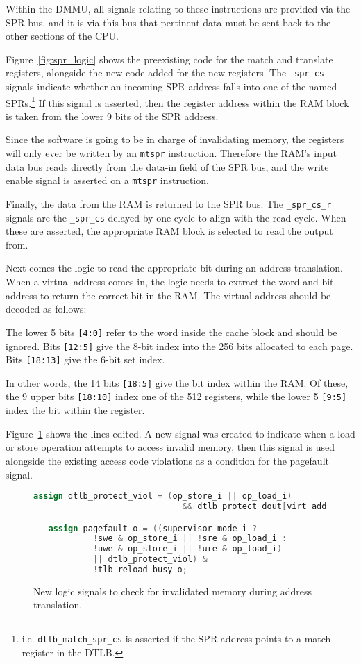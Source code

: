 Within the DMMU, all signals relating to these instructions are provided via the SPR bus, and it is via this bus that pertinent data must be sent back to the other sections of the CPU.

Figure~\ref{fig:spr_logic} shows the preexisting code for the match and translate registers, alongside the new code added for the new registers. The \verb|_spr_cs| signals indicate whether an incoming SPR address falls into one of the named SPRs.\footnote{i.e. \texttt{dtlb\_match\_spr\_cs} is asserted if the SPR address points to a match register in the DTLB.} If this signal is asserted, then the register address within the RAM block is taken from the lower 9 bits of the SPR address.

Since the software is going to be in charge of invalidating memory, the registers will only ever be written by an \texttt{mtspr} instruction. Therefore the RAM's input data bus reads directly from the data-in field of the SPR bus, and the write enable signal is asserted on a \texttt{mtspr} instruction.

Finally, the data from the RAM is returned to the SPR bus. The \verb|_spr_cs_r| signals are the \verb|_spr_cs| delayed by one cycle to align with the read cycle. When these are asserted, the appropriate RAM block is selected to read the output from.

Next comes the logic to read the appropriate bit during an address translation. When a virtual address comes in, the logic needs to extract the word and bit address to return the correct bit in the RAM. The virtual address should be decoded as follows:

The lower 5 bits \texttt{[4:0]} refer to the word inside the cache block and should be ignored. Bits \texttt{[12:5]} give the 8-bit index into the 256 bits allocated to each page. Bits \texttt{[18:13]} give the 6-bit set index.

In other words, the 14 bits \texttt{[18:5]} give the bit index within the RAM. Of these, the 9 upper bits \texttt{[18:10]} index one of the 512 registers, while the lower 5 \texttt{[9:5]} index the bit within the register.

Figure~\ref{fig:pgf_logic} shows the lines edited. A new signal was created to indicate when a load or store operation attempts to access invalid memory, then this signal is used alongside the existing access code violations as a condition for the pagefault signal.

\begin{figure}[t]
  \centering
  \begin{lstlisting}[language=Verilog]
   assign dtlb_protect_viol = (op_store_i || op_load_i)
                              && dtlb_protect_dout[virt_addr_i[9:5]];

   assign pagefault_o = ((supervisor_mode_i ?
			!swe & op_store_i || !sre & op_load_i :
			!uwe & op_store_i || !ure & op_load_i)
			|| dtlb_protect_viol) &
			!tlb_reload_busy_o;
  \end{lstlisting}
  \caption{New logic signals to check for invalidated memory during address translation.}
  \label{fig:pgf_logic}
\end{figure}

